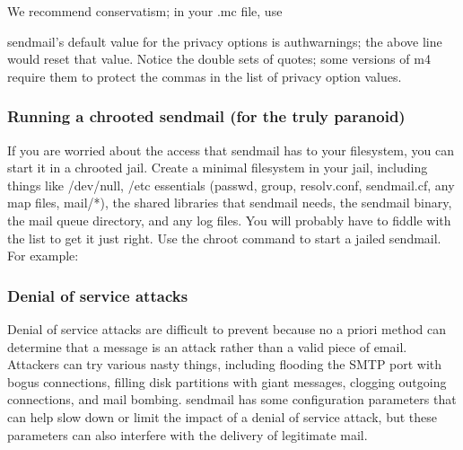 
We recommend conservatism; in your {.mc} file, use


{sendmail}'s default value for the privacy options is {authwarnings};
the above line would reset that value. Notice the double sets of quotes;
some versions of {m4} require them to protect the commas in the list of
privacy option values.

\subsubsection[Running a {chroot}ed {sendmail} (for the truly
paranoid)]{\texorpdfstring{\protect\hypertarget{part0026_split_038.htmlux5cux23_idTextAnchor1112}{}{}Running
a {chroot}ed {sendmail} (for the truly
paranoid)}{Running a chrooted sendmail (for the truly paranoid)}}

\protect\hypertarget{part0026_split_038.htmlux5cux23_idIndexMarker2588}{}{}If
you are worried about the access that {sendmail} has to your filesystem,
you can start it in a {chroot}ed jail. Create a minimal filesystem in
your jail, including things like {/dev/null}, {/etc} essentials
({passwd}, {group}, {resolv.conf}, {sendmail.cf}, any map files,
{mail/*}), the shared libraries that {sendmail} needs, the {sendmail}
binary, the mail queue directory, and any log files. You will probably
have to fiddle with the list to get it just right. Use the {chroot}
command to start a jailed {sendmail}. For example:


\subsubsection[Denial of service
attacks]{\texorpdfstring{\protect\hypertarget{part0026_split_038.htmlux5cux23_idTextAnchor1113}{}{}Denial
of service attacks}{Denial of service attacks}}

\protect\hypertarget{part0026_split_038.htmlux5cux23_idIndexMarker2589}{}{}Denial
of service attacks are difficult to prevent because no a priori method
can determine that a message is an attack rather than a valid piece of
email. Attackers can try various nasty things, including flooding the
SMTP port with bogus {connections}, filling disk partitions with giant
messages, clogging outgoing connections, and mail bombing. {sendmail}
has some configuration parameters that can help slow down or limit the
impact of a denial of service attack, but these parameters can also
interfere with the delivery of legitimate mail.


